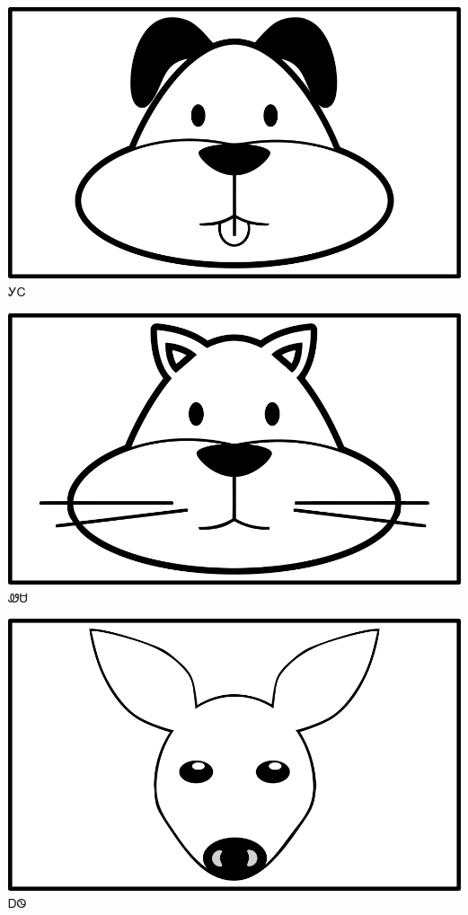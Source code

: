 \documentclass[avery5371]{flashcards}%
\begin{document}

\begin{flashcard}{
\includegraphics[width=0.95\columnwidth,height=.51\columnwidth,keepaspectratio]{../artwork/objects-animate/gihli}
}
\Huge ᎩᏟ
\end{flashcard}

\begin{flashcard}{
\includegraphics[width=0.95\columnwidth,height=.51\columnwidth,keepaspectratio]{../artwork/objects-animate/wesa}
}
\Huge ᏪᏌ
\end{flashcard}

\begin{flashcard}{
\includegraphics[width=0.95\columnwidth,height=.51\columnwidth,keepaspectratio]{../artwork/objects-animate/ahwi}
}
\Huge ᎠᏫ
\end{flashcard}
\end{document}
